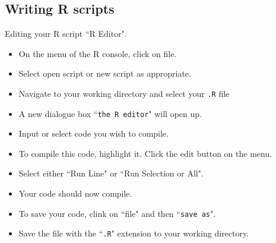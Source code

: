 \subsection{Writing R scripts}
Editing your R script ``R Editor".
\begin{itemize}
\item On the menu of the R console, click on file.
\item Select open script or new script as appropriate.
\item Navigate to your working directory and select your \texttt{.R} file
\item A new dialogue box ``\texttt{the R editor}" will open up.
\item Input or select code you wish to compile.
\item To compile this code, highlight it. Click the edit button on the menu.
\item Select either ``Run Line" or ``Run Selection or All".
\item Your code should now compile.
\item To save your code, clink on ``file" and then ``\texttt{save as}".
\item Save the file with the ``\texttt{.R}" extension to your working directory.
\end{itemize}
